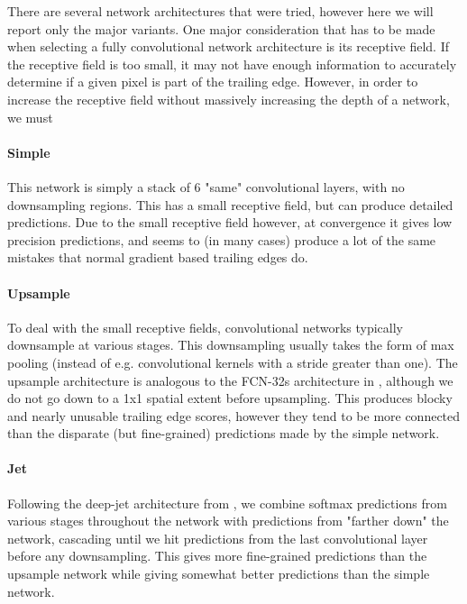 There are several network architectures that were tried, however here we will report only the major variants.
One major consideration that has to be made when selecting a fully convolutional network architecture is its receptive field.
If the receptive field is too small, it may not have enough information to accurately determine if a given pixel is part of the trailing edge.
However, in order to increase the receptive field without massively increasing the depth of a network, we must 

\paragraph{Simple}
This network is simply a stack of $6$ "same" convolutional layers, with no downsampling regions.
This has a small receptive field, but can produce detailed predictions.
Due to the small receptive field however, at convergence it gives low precision predictions, and seems to (in many cases) produce a lot of the same mistakes that normal gradient based trailing edges do.

\paragraph{Upsample}
To deal with the small receptive fields, convolutional networks typically downsample at various stages. 
This downsampling usually takes the form of max pooling (instead of e.g. convolutional kernels with a stride greater than one).
The upsample architecture is analogous to the FCN-32s architecture in \cite{long2015fully}, although we do not go down to a 1x1 spatial extent before upsampling.
This produces blocky and nearly unusable trailing edge scores, however they tend to be more connected than the disparate (but fine-grained) predictions made by the simple network.


\paragraph{Jet}
Following the deep-jet architecture from \cite{long2015fully}, we combine softmax predictions from various stages throughout the network with predictions from "farther down" the network, cascading until we hit predictions from the last convolutional layer before any downsampling.
This gives more fine-grained predictions than the upsample network while giving somewhat better predictions than the simple network.

